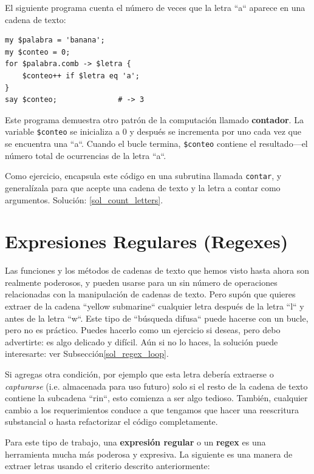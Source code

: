 El siguiente programa cuenta el número de veces que 
la letra ``a`` aparece en una cadena de texto:

\begin{lstlisting}
my $palabra = 'banana';
my $conteo = 0;
for $palabra.comb -> $letra {
    $conteo++ if $letra eq 'a';
}
say $conteo;              # -> 3
\end{lstlisting}
%

Este programa demuestra otro patrón de la computación 
llamado {\bf contador}. La variable \verb|$conteo| se inicializa
a 0 y después se incrementa por uno cada vez que se encuentra
una ``a``. Cuando el bucle termina, \verb|$conteo| contiene
el resultado---el número total de ocurrencias de la letra ``a``.

Como ejercicio, encapsula este código en una subrutina llamada
{\tt contar}, y generalízala para que acepte una cadena de texto 
y la letra a contar como argumentos. Solución: \ref{sol_count_letters}.
\label{count_letters}

\section{Expresiones Regulares (Regexes)}
\label{regex}

Las funciones y los métodos de cadenas de texto que hemos visto
hasta ahora son realmente poderosos, y pueden usarse para un 
sin número de operaciones relacionadas con la 
manipulación de cadenas de texto. Pero supón que quieres extraer
de la cadena ``yellow submarine`` cualquier letra después
de la letra ``l`` y antes de la letra ``w``. Este tipo de 
``búsqueda difusa`` puede hacerse con un bucle, pero no 
es práctico. Puedes hacerlo como un ejercicio si deseas,
pero debo advertirte: es algo delicado y difícil. Aún si 
no lo haces, la solución puede interesarte: 
ver Subsección\ref{sol_regex_loop}. 
\label{regex_loop}

Si agregas otra condición, por ejemplo que esta letra 
debería extraerse o \emph{capturarse} (i.e. almacenada para 
uso futuro) solo si el resto de la cadena de texto contiene
la subcadena ``rin``, esto comienza a ser algo tedioso. También,
cualquier cambio a los requerimientos conduce a que tengamos
que hacer una reescritura substancial o hasta refactorizar
el código completamente.

Para este tipo de trabajo, una {\bf expresión regular} 
o un {\bf regex} es una herramienta mucha más poderosa
y expresiva. La siguiente es una manera de extraer letras usando
el criterio descrito anteriormente: 


